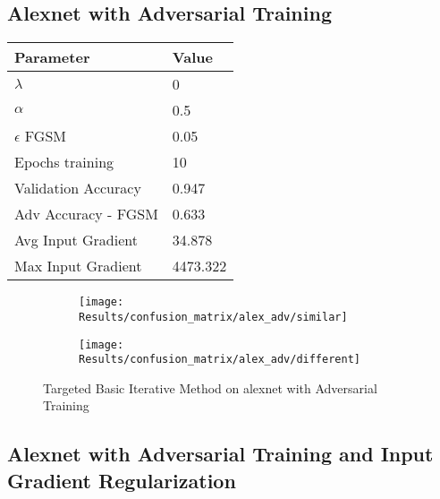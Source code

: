 \documentclass[draft,final]{vutinfth} %
\begin{document}
\subsection{Alexnet with Adversarial Training}
\begin{table}[h]
  \centering
  \begin{tabular}{ll}
    \toprule
			Parameter			& Value   \\
    \midrule
			$\lambda$								& 0				\\
			$\alpha$								& 0.5			\\
			$\epsilon$ FGSM					& 0.05		\\
			Epochs training					& 10			\\
			
			Validation Accuracy			& 0.947		\\
			Adv Accuracy - FGSM			& 0.633 	\\
			
			Avg Input Gradient			& 34.878	\\
			Max Input Gradient 			& 4473.322\\
    \bottomrule
  \end{tabular}
\end{table}


\begin{figure}[h]
  \begin{subfigure}[b]{0.5\columnwidth}
		\centering
    \texttt{[image: Results/confusion\_matrix/alex\_adv/similar]}
    \label{fig:exp:cm:alex_adv:similar}
  \end{subfigure}
  \begin{subfigure}[b]{0.5\columnwidth}
		\centering
    \texttt{[image: Results/confusion\_matrix/alex\_adv/different]}
    \label{fig:exp:cm:alex_adv:different}
  \end{subfigure}
  \caption{Targeted Basic Iterative Method on alexnet with Adversarial Training}
\end{figure}
\clearpage

\subsection{Alexnet with Adversarial Training and Input Gradient Regularization}
\end{document}
